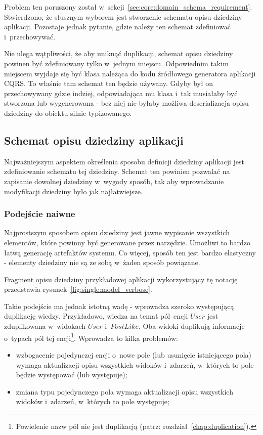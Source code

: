 Problem ten poruszony został w~sekcji~\ref{sec:core:domain_schema_requirement}.
Stwierdzono, że słusznym wyborem jest stworzenie schematu opisu dziedziny aplikacji.
Pozostaje jednak pytanie, gdzie należy ten schemat zdefiniować i~przechowywać.

Nie ulega wątpliwości, że aby uniknąć duplikacji, schemat opisu dziedziny powinen być zdefiniowany tylko w~jednym miejscu.
Odpowiednim takim miejscem wyjdaje się być klasa należąca do kodu źródłowego generatora aplikacji CQRS.
To właśnie tam schemat ten będzie używany.
Gdyby był on przechowywany gdzie indziej, odpowiadająca mu klasa i~tak musiałaby być stworzona lub wygenerowana - bez niej nie byłaby możliwa deserializacja opisu dziedziny do obiektu silnie typizowanego.


\subsection{Schemat opisu dziedziny aplikacji}

Najważniejszym aspektem określenia sposobu definicji dziedziny aplikacji jest zdefiniowanie schematu tej dziedziny.
Schemat ten powinien pozwalać na zapisanie dowolnej dziedziny w~wygody sposób, tak aby wprowadzanie modyfikacji dziedziny było jak najłatwiejsze.

\subsubsection{Podejście naiwne}

Najprostszym sposobem opisu dziedziny jest jawne wypisanie wszystkich elementów, które powinny być generowane przez narzędzie.
Umożliwi to bardzo łatwą generację artefaktów systemu.
Co więcej, sposób ten jest bardzo elastyczny - elementy dziedziny nie są ze sobą w~żaden sposób powiązane.

Fragment opisu dziedziny przykładowej aplikacji wykorzystujący tę notację przedstawia rysunek~\ref{fig:single:model_verbose}.



Takie podejście ma jednak istotną wadę - wprowadza szeroko występującą duplikację wiedzy.
Przykładowo, wiedza na temat pól~encji $User$ jest zduplikowana w~widokach $User$ i~$PostLike$.
Oba widoki duplikują informacje o~typach pól tej encji\footnote{Powielenie nazw pól nie jest duplikacją (patrz: rozdział~\ref{chap:duplication}).}.
Wprowadza to kilka problemów:

\begin{itemize}
 \item wzbogacenie pojedynczej encji o~nowe pole (lub usunięcie istniejącego pola) wymaga aktualizacji opisu wszystkich widoków i~zdarzeń, w~których to pole będzie występować (lub występuje);
 \item zmiana typu pojedynczego pola wymaga aktualizacji opisu wszystkich widoków i~zdarzeń, w~których to pole występuje;
\end{itemize}

